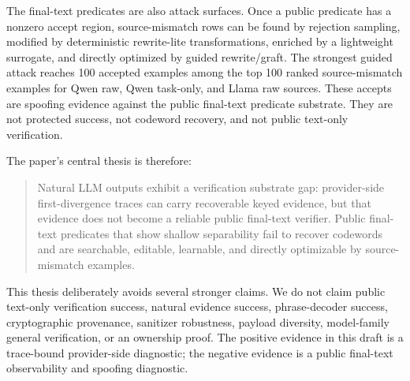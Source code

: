 The final-text predicates are also attack surfaces.  Once a public predicate
has a nonzero accept region, source-mismatch rows can be found by rejection
sampling, modified by deterministic rewrite-lite transformations, enriched by
a lightweight surrogate, and directly optimized by guided rewrite/graft.  The
strongest guided attack reaches 100 accepted examples among the top 100 ranked
source-mismatch examples for Qwen raw, Qwen task-only, and Llama raw sources.
These accepts are spoofing evidence against the public final-text predicate
substrate.  They are not protected success, not codeword recovery, and not
public text-only verification.

The paper's central thesis is therefore:
\begin{quote}
Natural LLM outputs exhibit a verification substrate gap: provider-side
first-divergence traces can carry recoverable keyed evidence, but that evidence
does not become a reliable public final-text verifier.  Public final-text
predicates that show shallow separability fail to recover codewords and are
searchable, editable, learnable, and directly optimizable by source-mismatch
examples.
\end{quote}

This thesis deliberately avoids several stronger claims.  We do not claim
public text-only verification success, natural evidence success,
phrase-decoder success, cryptographic provenance, sanitizer robustness,
payload diversity, model-family general verification, or an ownership proof.
The positive evidence in this draft is a trace-bound provider-side diagnostic;
the negative evidence is a public final-text observability and spoofing
diagnostic.

